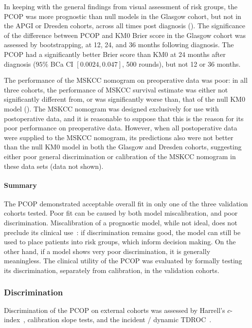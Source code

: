 \documentclass[dissertation.tex]{subfiles}
\begin{document}
In keeping with the general findings from visual assessment of risk groups, the \gls{PCOP} was more prognostic than null models in the Glasgow cohort, but not in the \gls{APGI} or Dresden cohorts, across all times post diagnosis ().  The significance of the difference between \gls{PCOP} and KM0 Brier score in the Glasgow cohort was assessed by bootstrapping, at 12, 24, and 36 months following diagnosis.  The \gls{PCOP} had a significantly better Brier score than KM0 at 24 months after diagnosis ($95\%$ BCa CI $[0.0024, 0.047]$, 500 rounds), but not 12 or 36 months.

The performance of the \gls{MSKCC} nomogram on preoperative data was poor: in all three cohorts, the performance of \gls{MSKCC} survival estimate was either not significantly different from, or was significantly worse than, that of the null KM0 model ().  The \gls{MSKCC} nomogram was designed exclusively for use with postoperative data, and it is reasonable to suppose that this is the reason for its poor performance on preoperative data.  However, when all postoperative data were supplied to the \gls{MSKCC} nomogram, its predictions also were not better than the null KM0 model in both the Glasgow and Dresden cohorts, suggesting either poor general discrimination or calibration of the \gls{MSKCC} nomogram in these data sets (data not shown).

\paragraph{Summary}
The \gls{PCOP} demonstrated acceptable overall fit in only one of the three validation cohorts tested.  Poor fit can be caused by both model miscalibration, and poor discrimination.  Miscalibration of a prognostic model, while not ideal, does not preclude its clinical use~\cite{Steyerberg2010}: if discrimination remains good, the model can still be used to place patients into risk groups, which inform decision making.  On the other hand, if a model shows very poor discrimination, it is generally meaningless.  The clinical utility of the \gls{PCOP} was evaluated by formally testing its discrimination, separately from calibration, in the validation cohorts.

\subsubsection{Discrimination}
Discrimination of the \gls{PCOP} on external cohorts was assessed by Harrell's $c$-index~\cite{Harrell1982}, calibration slope tests, and the incident / dynamic \gls{TDROC}~\cite{Heagerty2005}.
\end{document}
